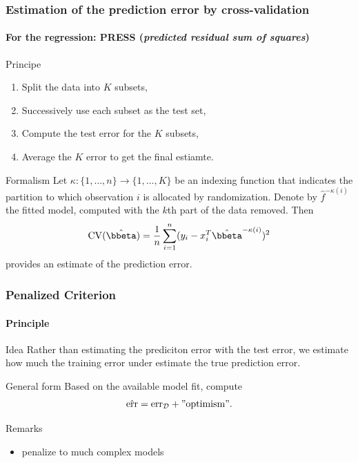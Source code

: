 \documentclass{beamer}\usepackage[]{graphicx}\usepackage[]{color}
\begin{document}
\begin{frame}
  \frametitle{Estimation of the prediction error by cross-validation}
  \framesubtitle{For the regression: PRESS (\textit{predicted residual sum of squares})}

  \begin{block}{Principe}
    \vspace{-.25cm}
    \begin{enumerate}
    \item Split the data into $K$ subsets,
    \item Successively use each subset as the test set,
    \item Compute the test error for the $K$ subsets,
    \item Average the $K$ error to get the final estiamte.
    \end{enumerate}
  \end{block}

  \vspace{-.25cm}
  
  \begin{block}{Formalism}
    Let  $\kappa  :  \{1,\dots,n\} \rightarrow  \{1,\dots,K\}$  be  an
    indexing   function  that   indicates  the   partition  to   which
    observation  $i$   is  allocated   by  randomization.   Denote  by
    $\hat{f}^{-\kappa(i)}$ the  fitted model, computed with  the $k$th
    part of the data removed.  Then
   \begin{equation*}
     \mathrm{CV}(\hat{\bbeta})     =    \frac{1}{n}\sum_{i=1}^n
     (y_i - x_i^T \hat{\bbeta}^{-\kappa(i)} )^2
   \end{equation*}
   provides an estimate of the prediction error.
  \end{block}
  
\end{frame}

\begin{frame}
  \frametitle{Penalized Criterion}
  \framesubtitle{Principle}
  
  \begin{block}{Idea}
    Rather than estimating the prediciton error with the test error, we estimate how much the training error under estimate the true prediction error.
  \end{block}

  \vfill
  
  \begin{block}{General form}
   Based on the available model fit, compute
    \begin{equation*}
      \hat{\mathrm{err}} = \mathrm{err}_{\mathcal{D}} + \mathrm{"optimism"}.
    \end{equation*}
  \end{block}

  \vfill
  
  \begin{block}{Remarks}
    \begin{itemize}
    \item \og penalize \fg to much complex models
    \end{itemize}
  \end{block}

\end{frame}
\end{document}

